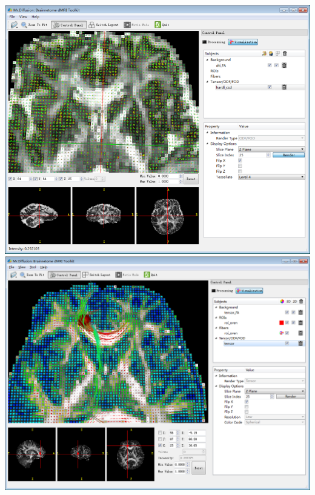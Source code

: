 \documentclass[letterpaper,10pt,english]{sphinxmanual}
\begin{document}
\includegraphics{4A.png} \includegraphics{mainwindow.png}
\end{document}
